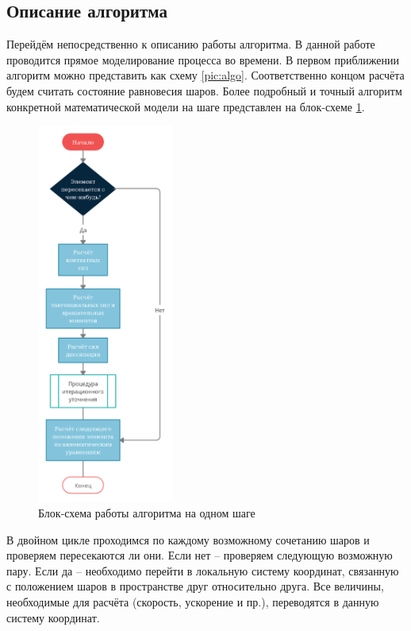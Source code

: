 \documentclass[a4paper]{article}
\begin{document}
\subsection{Описание алгоритма}

    
Перейдём непосредственно к описанию работы алгоритма.
В данной работе проводится прямое моделирование процесса во времени.
В первом приближении алгоритм можно представить как схему \ref{pic:algo}. 
Соответственно концом расчёта будем считать состояние равновесия шаров.
Более подробный и точный алгоритм конкретной математической модели на шаге представлен на блок-схеме \ref{pic:osn_block}.

\begin{figure}[h!]
	\centering
	\includegraphics[width=0.4\textwidth]{big_block}
	\caption{Блок-схема работы алгоритма на одном шаге}
	\label{pic:osn_block}
\end{figure} 

В двойном цикле проходимся по каждому возможному сочетанию шаров и проверяем пересекаются ли они.
Если нет -- проверяем следующую возможную пару.
Если да -- необходимо перейти в локальную систему координат, связанную с положением шаров в пространстве друг относительно друга. Все величины, необходимые для расчёта (скорость, ускорение и пр.), переводятся в данную систему координат.
\end{document}
